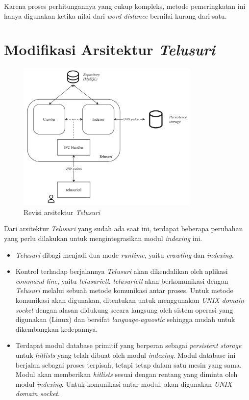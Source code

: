 Karena proses perhitungannya yang cukup kompleks, metode pemeringkatan ini hanya
digunakan ketika nilai dari \textit{word distance} bernilai kurang dari satu.

\section{Modifikasi Arsitektur \textit{Telusuri}}

\begin{figure}[H]
  \centering{}
	\includegraphics[width=0.8\textwidth]{gambar/arsitektur_baru}
  \caption{Revisi arsitektur \textit{Telusuri}}
\end{figure}

Dari arsitektur \textit{Telusuri} yang sudah ada saat ini, terdapat beberapa 
perubahan yang perlu dilakukan untuk mengintegrasikan modul \textit{indexing}
ini.

\begin{itemize}
  \item{\textit{Telusuri} dibagi menjadi dua mode \textit{runtime}, yaitu 
    \textit{crawling} dan \textit{indexing}.}
  \item{Kontrol terhadap berjalannya \textit{Telusuri} akan dikendalikan oleh 
    aplikasi \textit{command-line}, yaitu \textit{telusurictl}. \textit{telusurictl} 
    akan berkomunikasi dengan \textit{Telusuri} melalui sebuah metode komunikasi 
    antar proses. Untuk metode komunikasi akan digunakan, ditentukan untuk 
    menggunakan \textit{UNIX domain socket} dengan alasan didukung secara 
    langsung oleh sistem operasi yang digunakan (Linux) dan bersifat
    \textit{language-agnostic} sehingga mudah untuk dikembangkan kedepannya.}
  \item{Terdapat modul database primitif yang berperan sebagai \textit{persistent 
    storage} untuk \textit{hitlists} yang telah dibuat oleh modul \textit{indexing}.
    Modul database ini berjalan sebagai proses terpisah, tetapi tetap dalam satu 
    mesin yang sama. Modul akan memberikan \textit{hitlists} sesuai dengan 
    rentang yang diminta oleh modul \textit{indexing}. Untuk komunikasi antar 
    modul, akan digunakan \textit{UNIX domain socket}.}
\end{itemize} 

